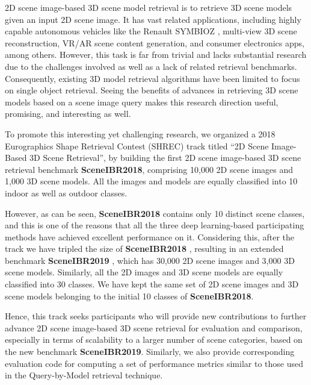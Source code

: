\documentclass[../main.tex]{subfiles}
\begin{document}
2D scene image-based 3D scene model retrieval is to retrieve 3D scene models given an input 2D scene image. It has vast related applications, including highly capable autonomous vehicles like the Renault SYMBIOZ \cite{Renault} \cite{Youtube}, multi-view 3D scene reconstruction, VR/AR scene content generation, and consumer electronics apps, among others. However, this task is far from trivial and lacks substantial research due to the challenges involved as well as a lack of related retrieval benchmarks. Consequently, existing 3D model retrieval algorithms have been limited to focus on single object retrieval. Seeing the benefits of advances in retrieving 3D scene models based on a scene image query makes this research direction useful, promising, and interesting as well.

To promote this interesting yet challenging research, we organized a 2018 Eurographics Shape Retrieval Contest (SHREC) track \cite{SHREC18-SceneIBR-Track} titled “2D Scene Image-Based 3D Scene Retrieval”, by building the first 2D scene image-based 3D scene retrieval benchmark \textbf{SceneIBR2018}, comprising 10,000 2D scene images and 1,000 3D scene models. All the images and models are equally classified into 10 indoor as well as outdoor classes.

However, as can be seen, \textbf{SceneIBR2018} contains only 10 distinct scene classes, and this is one of the reasons that all the three deep learning-based participating methods have achieved excellent performance on it. Considering this, after the track we have tripled the size of \textbf{SceneIBR2018} , resulting in an extended benchmark \textbf{SceneIBR2019} \cite{MIPR}, which has 30,000 2D scene images and 3,000 3D scene models. Similarly, all the 2D images and 3D scene models are equally classified into 30 classes. We have kept the same set of 2D scene images and 3D scene models belonging to the initial 10 classes of \textbf{SceneIBR2018}.

Hence, this track seeks participants who will provide new contributions to further advance 2D scene image-based 3D scene retrieval for evaluation and comparison, especially in terms of scalability to a larger number of scene categories, based on the new benchmark \textbf{SceneIBR2019}. Similarly, we also provide corresponding evaluation code for computing a set of performance metrics similar to those used in the Query-by-Model retrieval technique.
\end{document}
